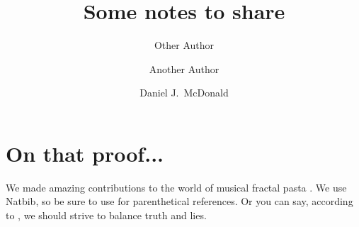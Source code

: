 \documentclass[12pt]{article}
\title{Some notes to share}
\author[a,1]{Other Author}
\author[b]{Another Author}
\author[a]{Daniel J.\ McDonald}
\date{}
\begin{document}
\maketitle


\section{On that proof...}\label{sec:proof}


We made amazing contributions to the world of musical fractal pasta 
\citep{McDonald2017,Tibshirani2013}. We use Natbib, so be sure to use
\citep{Stein1981} for parenthetical references. Or you can say, according to
\citet{HastieTibshirani2009}, we should strive to balance truth and lies.


      
\end{document}
